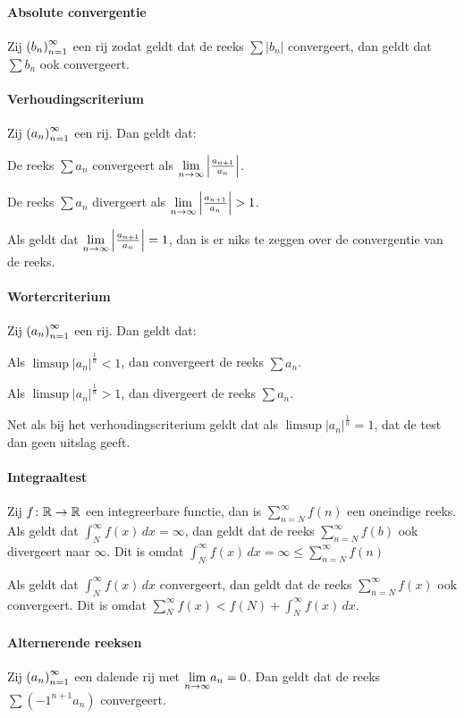 \paragraph{Absolute convergentie} Zij \(\left(b_{n}\right)_{n=1}^{\infty}\) een rij zodat geldt dat de reeks \(\sum|b_{n}|\) convergeert, dan geldt dat \(\sum b_{n}\) ook convergeert.

\paragraph{Verhoudingscriterium} Zij \(\left(a_{n}\right)_{n=1}^{\infty}\) een rij. Dan geldt dat:
\begin{enum}[i.]
    \item De reeks \(\sum a_{n}\) convergeert als \(\underset{n\to\infty}{\text{lim}}\left|\frac{a_{n+1}}{a_{n}}\right|\).
    \item De reeks \(\sum a_{n}\) divergeert als \(\liminfty{n}\left|\frac{a_{n+1}}{a_{n}}\right|>1\).
    \item Als geldt dat \(\underset{n\to\infty}{\text{lim}}\left|\frac{a_{n+1}}{a_{n}}\right|=1\), dan is er niks te zeggen over de convergentie van de reeks.
\end{enum}

\paragraph{Wortercriterium} Zij \(\left(a_{n}\right)_{n=1}^{\infty}\) een rij. Dan geldt dat:
\begin{enum}[i.]
    \item Als \(\limsup\left|a_{n}\right|^{\frac{1}{n}}<1\), dan convergeert de reeks \(\sum a_{n}\).
    \item Als \(\limsup\left|a_{n}\right|^{\frac{1}{n}}>1\), dan divergeert de reeks \(\sum a_{n}\).
    \item Net als bij het verhoudingscriterium geldt dat als \(\limsup\left|a_{n}\right|^{\frac{1}{n}}=1\), dat de test dan geen uitslag geeft.
\end{enum}

\paragraph{Integraaltest} Zij \(f\colon\mathbb{R}\to\mathbb{R}\) een integreerbare functie, dan is \(\sum_{n=N}^{\infty}f(n)\) een oneindige reeks. Als geldt dat \(\int_{N}^{\infty}f(x)\,dx=\infty\), dan geldt dat de reeks \(\sum_{n=N}^{\infty}f(b)\) ook divergeert naar \(\infty\). Dit is omdat \(\int_{N}^{\infty}f(x)\,dx=\infty\leq\sum_{n=N}^{\infty}f(n)\)

Als geldt dat \(\int_{N}^{\infty}f(x)\,dx\) convergeert, dan geldt dat de reeks \(\sum_{n=N}^{\infty}f(x)\) ook convergeert. Dit is omdat \(\sum_{N}^{\infty}f(x)<f(N)+\int_{N}^{\infty}f(x)\,dx\).

\paragraph{Alternerende reeksen} Zij \(\left(a_{n}\right)_{n=1}^{\infty}\) een dalende rij met \(\underset{n\to\infty}{\text{lim}}a_{n}=0\). Dan geldt dat de reeks \(\sum(-1^{n+1}a_{n})\) convergeert.